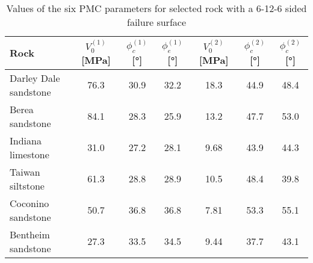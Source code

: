 \begin{table}[!ht]
    \centering 
    \captionsetup{justification=centering}
    \caption{Values of the six PMC parameters for selected rock with a 6-12-6 sided failure surface}
    \begin{tabular}{lcccccc}
        \hline
        Rock & $V_0^{(1)}$ [\si{\mega\pascal}] & $\phi_c^{(1)}$ [\si{\degree}] & $\phi_e^{(1)}$ [\si{\degree}] & $V_0^{(2)}$ [\si{\mega\pascal}] & $\phi_c^{(2)}$ [\si{\degree}] & $\phi_c^{(2)}$ [\si{\degree}]\\
        \hline
        \hline
        Darley Dale sandstone & 76.3 & 30.9 &  32.2 & 18.3 & 44.9 & 48.4 \\
        Berea sandstone & 84.1 & 28.3 &  25.9 & 13.2 & 47.7 & 53.0 \\
        Indiana limestone & 31.0 & 27.2 &  28.1 & 9.68 & 43.9 & 44.3 \\
        Taiwan siltstone & 61.3 & 28.8 &  28.9 & 10.5 & 48.4 & 39.8 \\
        Coconino sandstone & 50.7 & 36.8 &  36.8 & 7.81 & 53.3 & 55.1 \\
        Bentheim sandstone & 27.3 & 33.5 &  34.5 & 9.44 & 37.7 & 43.1 \\
    \end{tabular}
    \label{AppE:litt_rock}
\end{table}


